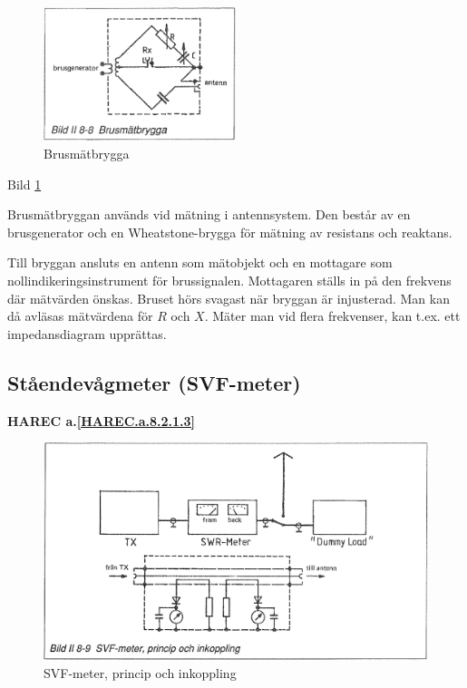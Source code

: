 \begin{figure}
  \includegraphics[width=0.5\textwidth]{images/bild_2_8-08}
  \caption{Brusmätbrygga}
  \label{fig:bildII8-8}
\end{figure}

Bild \ref{fig:bildII8-8}

Brusmätbryggan används vid mätning i antennsystem. Den består av en
brusgenerator och en Wheatstone-brygga för mätning av resistans och
reaktans.

Till bryggan ansluts en antenn som mätobjekt och en mottagare som
nollindikeringsinstrument för brussignalen. Mottagaren ställs in på
den frekvens där mätvärden önskas. Bruset hörs svagast när bryggan är
injusterad. Man kan då avläsas mätvärdena för \(R\) och \(X\). Mäter
man vid flera frekvenser, kan t.ex. ett impedansdiagram upprättas.

\subsection{Ståendevågmeter (SVF-meter)}
\textbf{
HAREC a.\ref{HAREC.a.8.2.1.3}\label{myHAREC.a.8.2.1.3}
}

\begin{figure}
  \includegraphics[width=\textwidth]{images/bild_2_8-09}
  \caption{SVF-meter, princip och inkoppling}
  \label{fig:bildII8-9}
\end{figure}

